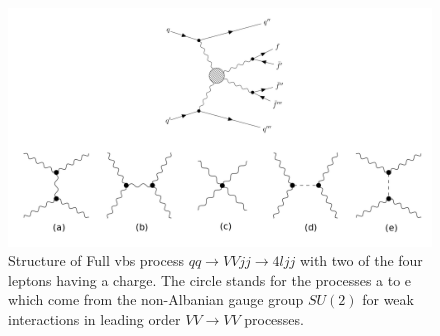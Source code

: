 \documentclass[../Bachelorarbeit.tex]{subfiles}
\begin{document}
\label{sec:VBS}

\begin{figure}[h]
    \centering
    \includegraphics[width=\textwidth]{images/feynman_full_VBS.png}
    \caption{Structure of Full \acrshort{vbs} process $qq\rightarrow VVjj\rightarrow 4ljj$ with two of the four leptons having a charge. The circle stands for the processes a to e
        which come from the non-Albanian gauge group $SU(2)$ for weak interactions in leading order $VV \rightarrow VV$ processes.\cite{Bittrich.27.05.2020}}
    \label{fig:feynman_full_VBS}
\end{figure}
\end{document}
